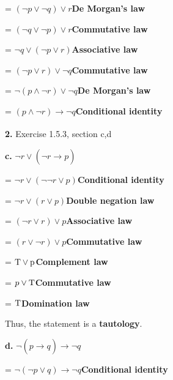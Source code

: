 \documentclass[11pt]{article}
\begin{document}
	= $(\neg p\vee \neg q)\vee r$\hspace{17mm}\textbf{De Morgan's law}
	
	= $(\neg q\vee \neg p)\vee r$\hspace{17mm}\textbf{Commutative law}
	
	= $\neg q\vee (\neg p\vee r)$\hspace{17mm}\textbf{Associative law}
	
	= $(\neg p\vee r)\vee \neg q$\hspace{17mm}\textbf{Commutative law}
	
	= $\neg (p\wedge \neg r)\vee \neg q$\hspace{15mm}\textbf{De Morgan's law}
	
	= $(p\wedge \neg r)\xrightarrow[]{}\neg q$\hspace{15.5mm}\textbf{Conditional identity}
	
	\vspace{3mm}
	\textbf{2.} Exercise 1.5.3, section c,d
	\medskip
	
	\textbf{c.}
	$\neg r\vee (\neg r\xrightarrow[]{}p)$

	= $\neg r\vee (\neg \neg r\vee p)$\hspace{15mm}\textbf{Conditional identity}
	
	= $\neg r\vee (r\vee p)$\hspace{20mm}\textbf{Double negation law}
	
	= $(\neg r\vee r)\vee p$\hspace{20mm}\textbf{Associative law}
	
	= $(r\vee \neg r)\vee p$\hspace{20mm}\textbf{Commutative law}
	
	= $\rm T\vee p$\hspace{30.5mm}\textbf{Complement law}
	
	= $p\vee \rm T$\hspace{31mm}\textbf{Commutative law}
	
	= $\rm T$\hspace{37.5mm}\textbf{Domination law}
	
	Thus, the statement is a \textbf{tautology}.
	\vspace{2mm}
	
	\textbf{d.}
    $\neg (p\xrightarrow[]{}q)\xrightarrow[]{}\neg q$
    
    = $\neg (\neg p\vee q)\xrightarrow[]{}\neg q$\hspace{16mm}\textbf{Conditional identity}
    
\end{document}
